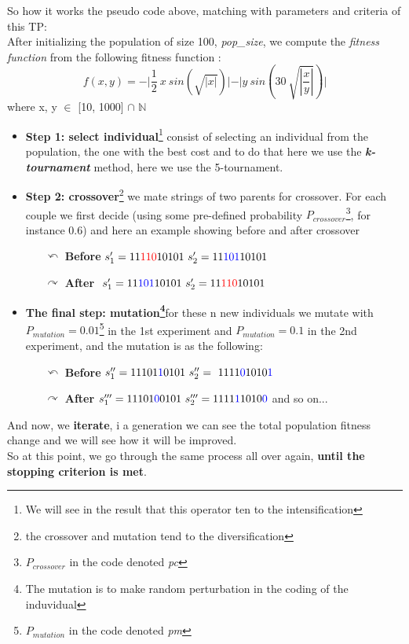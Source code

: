 So how it works the pseudo code above, matching with parameters and criteria of this TP:\\
After initializing the population of size 100, \textit{pop\_size}, we compute the \textit{fitness function }from the following fitness function :
\begin{equation}
f(x,y) =  - |\frac{1}{2}\ x\ sin(
\sqrt{|x|})\mathopen{|}  - \mathopen{|} y\ sin(30\ \sqrt{|\frac{x}{y}|}) \mathopen{|} 
\end{equation}
where x, y $ \in $  [10, 1000] $ \cap $  $\mathbb{N}$
\begin{itemize}
\item \textbf{Step 1: select individual}\footnote{We will see in the result that this operator ten to the intensification} consist of selecting an individual from the population, the one with the best cost and to do that here we use the \textit{\textbf{k-tournament}} method, here we use the 5-tournament.
\item \textbf{Step 2: crossover}\footnote{the crossover and mutation tend to the diversification} we mate strings of two parents for crossover. For each
couple we first decide (using some pre-defined probability 
 $P_{crossover}$\footnote{$ P_{crossover} $ in the code denoted \textit{pc}}, for instance 0.6) and here an example showing before and after crossover
\begin{itemize}
\item[$ \curvearrowleft $] \textbf{Before} $ s'_1 = 11\textcolor{red}{110}10101\ s'_2 = 11\textcolor{blue}{101}10101 $
\item[$ \curvearrowright $] \textbf{After }  $\ s'_1 = 11\textcolor{blue}{101}10101\ s'_2 = 11\textcolor{red}{110}10101 $
\end{itemize}
\item \textbf{The final step: mutation\footnote{The mutation is to make random perturbation in the coding of the induvidual }}for these n new individuals we mutate with $P_{mutation}=0.01$\footnote{$ P_{mutation} $ in the code denoted \textit{pm}} in the 1st experiment and  $ P_{mutation} = 0.1$ in the 2nd experiment, and the mutation is as the following:
\begin{itemize}
\item[$ \curvearrowleft $] \textbf{Before} $ s''_1 =  11101\textcolor{blue}{1}0101\ s''_2 =\ 1111\textcolor{blue}{0}1010\textcolor{blue}{1} $
\item[$ \curvearrowright $] \textbf{After }  $ s'''_1 = 11101\textcolor{blue}{0}0101\ s'''_2 = 1111\textcolor{blue}{1}1010\textcolor{blue}{0} $
and so on...
\end{itemize}
\end{itemize}
And now, we \textbf{{\large iterate}}, i a  generation we can see the total population fitness change and we will see how it will be improved.\\
So at this point, we go through the same process all over again, {\large \textbf{until the stopping criterion is met}}.
